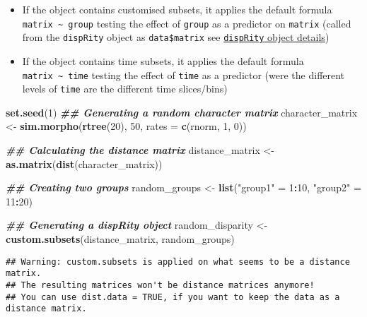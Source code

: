 \documentclass[
]{book}
\newenvironment{Shaded}{\begin{snugshade}}{\end{snugshade}}
\newcommand{\AttributeTok}[1]{\textcolor[rgb]{0.13,0.29,0.53}{#1}}
\newcommand{\DecValTok}[1]{\textcolor[rgb]{0.00,0.00,0.81}{#1}}
\newcommand{\DocumentationTok}[1]{\textcolor[rgb]{0.56,0.35,0.01}{\textbf{\textit{#1}}}}
\newcommand{\FunctionTok}[1]{\textcolor[rgb]{0.13,0.29,0.53}{\textbf{#1}}}
\newcommand{\NormalTok}[1]{#1}
\newcommand{\OtherTok}[1]{\textcolor[rgb]{0.56,0.35,0.01}{#1}}
\newcommand{\SpecialCharTok}[1]{\textcolor[rgb]{0.81,0.36,0.00}{\textbf{#1}}}
\newcommand{\StringTok}[1]{\textcolor[rgb]{0.31,0.60,0.02}{#1}}
\providecommand{\tightlist}{%
  \setlength{\itemsep}{0pt}\setlength{\parskip}{0pt}}
\begin{document}
\begin{itemize}
\tightlist
\item
  If the object contains customised subsets, it applies the default formula \texttt{matrix\ \textasciitilde{}\ group} testing the effect of \texttt{group} as a predictor on \texttt{matrix} (called from the \texttt{dispRity} object as \texttt{data\$matrix} see \protect\hyperlink{The-dispRity-object-content}{\texttt{dispRity} object details})
\item
  If the object contains time subsets, it applies the default formula \texttt{matrix\ \textasciitilde{}\ time} testing the effect of \texttt{time} as a predictor (were the different levels of \texttt{time} are the different time slices/bins)
\end{itemize}

\begin{Shaded}
\begin{Highlighting}[]
\FunctionTok{set.seed}\NormalTok{(}\DecValTok{1}\NormalTok{)}
\DocumentationTok{\#\# Generating a random character matrix}
\NormalTok{character\_matrix }\OtherTok{\textless{}{-}} \FunctionTok{sim.morpho}\NormalTok{(}\FunctionTok{rtree}\NormalTok{(}\DecValTok{20}\NormalTok{), }\DecValTok{50}\NormalTok{,}
                               \AttributeTok{rates =} \FunctionTok{c}\NormalTok{(rnorm, }\DecValTok{1}\NormalTok{, }\DecValTok{0}\NormalTok{))}

\DocumentationTok{\#\# Calculating the distance matrix}
\NormalTok{distance\_matrix }\OtherTok{\textless{}{-}} \FunctionTok{as.matrix}\NormalTok{(}\FunctionTok{dist}\NormalTok{(character\_matrix))}

\DocumentationTok{\#\# Creating two groups}
\NormalTok{random\_groups }\OtherTok{\textless{}{-}} \FunctionTok{list}\NormalTok{(}\StringTok{"group1"} \OtherTok{=} \DecValTok{1}\SpecialCharTok{:}\DecValTok{10}\NormalTok{, }\StringTok{"group2"} \OtherTok{=} \DecValTok{11}\SpecialCharTok{:}\DecValTok{20}\NormalTok{)}

\DocumentationTok{\#\# Generating a dispRity object}
\NormalTok{random\_disparity }\OtherTok{\textless{}{-}} \FunctionTok{custom.subsets}\NormalTok{(distance\_matrix, random\_groups)}
\end{Highlighting}
\end{Shaded}

\begin{verbatim}
## Warning: custom.subsets is applied on what seems to be a distance matrix.
## The resulting matrices won't be distance matrices anymore!
## You can use dist.data = TRUE, if you want to keep the data as a distance matrix.
\end{verbatim}
\end{document}
